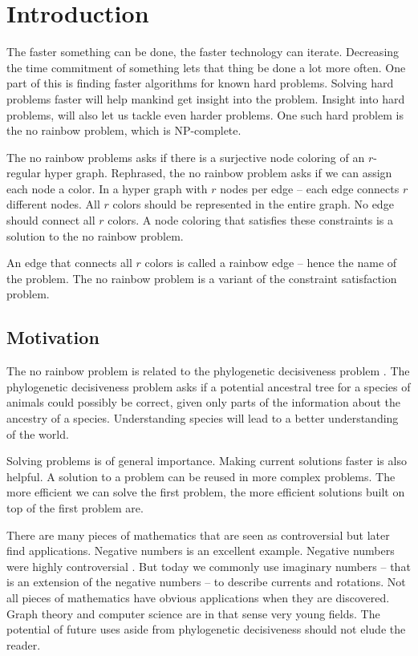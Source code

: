 \documentclass[msc,lith,english]{liuthesis}
\author{Edvard Thörnros}
\begin{document}
\chapter{Introduction}
\label{chaIntro}
The faster something can be done, the faster technology can iterate.
Decreasing the time commitment of something lets that thing be done a lot more often.
One part of this is finding faster algorithms for known hard problems.
Solving hard problems faster will help mankind get insight into the problem.
Insight into hard problems, will also let us tackle even harder problems.
One such hard problem is the no rainbow problem, which is NP-complete.

The no rainbow problems \cite{sourceNoRainbow} asks if there is a surjective node coloring of an $r$-regular hyper graph.
Rephrased, the no rainbow problem asks if we can assign each node a color.
In a hyper graph with $r$ nodes per edge -- each edge connects $r$ different nodes.
All $r$ colors should be represented in the entire graph.
No edge should connect all $r$ colors.
A node coloring that satisfies these constraints is a solution to the no rainbow problem.

An edge that connects all $r$ colors is called a rainbow edge -- hence the name of the problem.
The no rainbow problem is a variant of the constraint satisfaction problem. 

\section{Motivation}
The no rainbow problem is related to the phylogenetic decisiveness problem \cite{sourceNoRainbow}\cite{sourcePhylogeneticDecisiveness}. The
phylogenetic decisiveness problem asks if a potential ancestral tree for a
species of animals could possibly be correct, given only parts of the
information about the ancestry of a species.
Understanding species will lead to a better understanding of the world.  

Solving problems is of general importance. Making current solutions faster is also helpful.
A solution to a problem can be reused in more complex problems. The more
efficient we can solve the first problem, the more efficient solutions built on
top of the first problem are. 

There are many pieces of mathematics that are seen as controversial but later find applications.
Negative numbers is an excellent example. Negative numbers were highly
controversial \cite{sourceNeg}. But today we commonly use imaginary numbers -- that is an extension of the negative numbers -- to
describe currents and rotations. Not all pieces of mathematics have obvious
applications when they are discovered. Graph theory and computer science are in
that sense very young fields.
The potential of future uses aside from phylogenetic decisiveness should not elude the reader.
\end{document}
